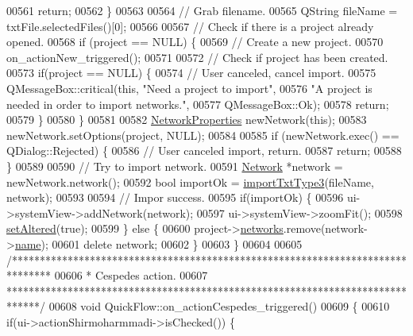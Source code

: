 \begin{DoxyCode}
00561     \textcolor{keywordflow}{return};
00562   \}
00563 
00564   \textcolor{comment}{// Grab filename.}
00565   QString fileName = txtFile.selectedFiles()[0];
00566 
00567   \textcolor{comment}{// Check if there is a project already opened.}
00568   \textcolor{keywordflow}{if} (project == NULL) \{
00569     \textcolor{comment}{// Create a new project.}
00570     on\_actionNew\_triggered();
00571 
00572     \textcolor{comment}{// Check if project has been created.}
00573     \textcolor{keywordflow}{if}(project == NULL) \{
00574       \textcolor{comment}{// User canceled, cancel import.}
00575       QMessageBox::critical(\textcolor{keyword}{this}, \textcolor{stringliteral}{"Need a project to import"},
00576                             \textcolor{stringliteral}{"A project is needed in order to import networks."},
00577                             QMessageBox::Ok);
00578       \textcolor{keywordflow}{return};
00579     \}
00580   \}
00581 
00582   \hyperlink{class_network_properties}{NetworkProperties} newNetwork(\textcolor{keyword}{this});
00583   newNetwork.setOptions(project, NULL);
00584 
00585   \textcolor{keywordflow}{if} (newNetwork.exec() == QDialog::Rejected) \{
00586     \textcolor{comment}{// User canceled import, return.}
00587     \textcolor{keywordflow}{return};
00588   \}
00589 
00590   \textcolor{comment}{// Try to import network.}
00591   \hyperlink{class_network}{Network} *network = newNetwork.network();
00592   \textcolor{keywordtype}{bool} importOk = \hyperlink{import_8cpp_acd1a54d4b2a28043b1489f0be7423ecd}{importTxtType3}(fileName, network);
00593 
00594   \textcolor{comment}{// Impor success.}
00595   \textcolor{keywordflow}{if}(importOk) \{
00596     ui->systemView->addNetwork(network);
00597     ui->systemView->zoomFit();
00598     \hyperlink{group___window_ga4b63ea5ca52a9eea14db0a22b5a133f8}{setAltered}(\textcolor{keyword}{true});
00599   \} \textcolor{keywordflow}{else} \{
00600     project->\hyperlink{class_project_aa98126154cab59769a431668e6f17daf}{networks}.remove(network->\hyperlink{class_network_ab6643733a517f930c60b06f5ffd78186}{name});
00601     \textcolor{keyword}{delete} network;
00602   \}
00603 \}
00604 
00605 \textcolor{comment}{/*******************************************************************************}
00606 \textcolor{comment}{ * Cespedes action.}
00607 \textcolor{comment}{ ******************************************************************************/}
00608 \textcolor{keywordtype}{void} QuickFlow::on\_actionCespedes\_triggered()
00609 \{
00610   \textcolor{keywordflow}{if}(ui->actionShirmoharmmadi->isChecked()) \{

\end{DoxyCode}
